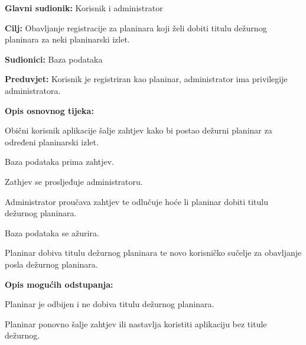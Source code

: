 		\noindent {}
		\begin{packed_item}
			
			\item \textbf{Glavni sudionik: } Korisnik i administrator
			\item  \textbf{Cilj:} Obavljanje registracije za planinara koji želi dobiti titulu dežurnog planinara za neki planinarski izlet.
			\item  \textbf{Sudionici:} Baza podataka
			\item  \textbf{Preduvjet:} Korisnik je registriran kao planinar, administrator ima privilegije administratora.
			\item  \textbf{Opis osnovnog tijeka:}
			
			\item[] \begin{packed_enum}
				
				\item Obični korisnik aplikacije šalje zahtjev kako bi postao dežurni planinar za određeni planinarski izlet.
				\item Baza podataka prima zahtjev.
				\item Zathjev se prosljeđuje administratoru.
				\item Administrator proučava zahtjev te odlučuje hoće li planinar dobiti titulu dežurnog planinara.
				\item Baza podataka se ažurira.
				\item Planinar dobiva titulu dežurnog planinara te novo korisničko sučelje za obavljanje posla dežurnog planinara.
				
			\end{packed_enum}
			
			\item	\textbf{Opis mogućih odstupanja:}
			
			\item[] \begin{packed_item}
				
				\item[6.a] Planinar je odbijen i ne dobiva titulu dežurnog planinara.
				\item[] \begin{packed_enum}
					
					\item Planinar ponovno šalje zahtjev ili nastavlja koristiti aplikaciju bez titule dežurnog. 
				\end{packed_enum}
				
			\end{packed_item}
		\end{packed_item}
		
